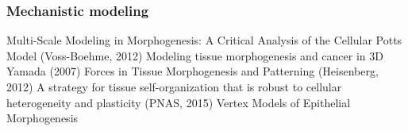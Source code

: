 \documentclass[fleqn,10pt]{wlscirep}
\begin{document}




\subsubsection*{Mechanistic modeling}
Multi-Scale Modeling in Morphogenesis: A Critical Analysis of the Cellular Potts Model (Voss-Boehme, 2012)
Modeling tissue morphogenesis and cancer in 3D Yamada (2007)
Forces in Tissue Morphogenesis and Patterning (Heisenberg, 2012)
A strategy for tissue self-organization that is robust to
cellular heterogeneity and plasticity (PNAS, 2015)
Vertex Models of Epithelial Morphogenesis
\end{document}
